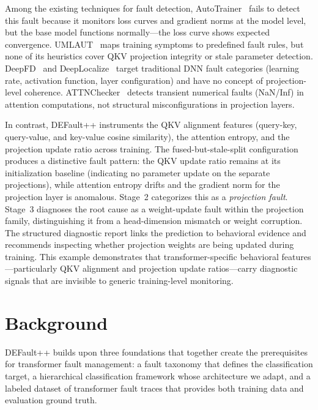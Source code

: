 Among the existing techniques for fault detection, AutoTrainer~\cite{autotrainer} fails to detect this fault because it monitors loss curves and gradient norms at the model level, but the base model functions normally---the loss curve shows expected convergence. UMLAUT~\cite{umlaut} maps training symptoms to predefined fault rules, but none of its heuristics cover QKV projection integrity or stale parameter detection. DeepFD~\cite{deepfd} and DeepLocalize~\cite{deeplocalize} target traditional DNN fault categories (learning rate, activation function, layer configuration) and have no concept of projection-level coherence. ATTNChecker~\cite{liang2025attnchecker} detects transient numerical faults (NaN/Inf) in attention computations, not structural misconfigurations in projection layers.

In contrast, DEFault++ instruments the QKV alignment features (query-key, query-value, and key-value cosine similarity), the attention entropy, and the projection update ratio across training. The fused-but-stale-split configuration produces a distinctive fault pattern: the QKV update ratio remains at its initialization baseline (indicating no parameter update on the separate projections), while attention entropy drifts and the gradient norm for the projection layer is anomalous. Stage~2 categorizes this as a \emph{projection fault}. Stage~3 diagnoses the root cause as a weight-update fault within the projection family, distinguishing it from a head-dimension mismatch or weight corruption. The structured diagnostic report links the prediction to behavioral evidence and recommends inspecting whether projection weights are being updated during training. This example demonstrates that transformer-specific behavioral features---particularly QKV alignment and projection update ratios---carry diagnostic signals that are invisible to generic training-level monitoring.

\section{Background}
\label{sec:defaultpp_background}

DEFault++ builds upon three foundations that together create the prerequisites for transformer fault management: a fault taxonomy that defines the classification target, a hierarchical classification framework whose architecture we adapt, and a labeled dataset of transformer fault traces that provides both training data and evaluation ground truth.

